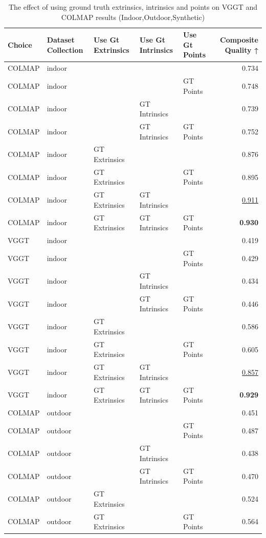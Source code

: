 \begin{table}[H]
\caption{\ifdefined\customcaption \customcaption \else The effect of using ground truth extrinsics, intrinsics and points on VGGT and COLMAP results (Indoor,Outdoor,Synthetic) \fi}
\label{tab:06_gt_cams_indoor,outdoor,synthetic}
\centering
\scriptsize
\begin{tabular}{lllllr}
\toprule
Choice & Dataset Collection & Use Gt Extrinsics & Use Gt Intrinsics & Use Gt Points & Composite Quality ↑ \\
\midrule
COLMAP & indoor &  &  &  & 0.734 \\
COLMAP & indoor &  &  & GT Points & 0.748 \\
COLMAP & indoor &  & GT Intrinsics &  & 0.739 \\
COLMAP & indoor &  & GT Intrinsics & GT Points & 0.752 \\
COLMAP & indoor & GT Extrinsics &  &  & 0.876 \\
COLMAP & indoor & GT Extrinsics &  & GT Points & 0.895 \\
COLMAP & indoor & GT Extrinsics & GT Intrinsics &  & \underline{0.911} \\
COLMAP & indoor & GT Extrinsics & GT Intrinsics & GT Points & \textbf{0.930} \\
\midrule
VGGT & indoor &  &  &  & 0.419 \\
VGGT & indoor &  &  & GT Points & 0.429 \\
VGGT & indoor &  & GT Intrinsics &  & 0.434 \\
VGGT & indoor &  & GT Intrinsics & GT Points & 0.446 \\
VGGT & indoor & GT Extrinsics &  &  & 0.586 \\
VGGT & indoor & GT Extrinsics &  & GT Points & 0.605 \\
VGGT & indoor & GT Extrinsics & GT Intrinsics &  & \underline{0.857} \\
VGGT & indoor & GT Extrinsics & GT Intrinsics & GT Points & \textbf{0.929} \\
\midrule
COLMAP & outdoor &  &  &  & 0.451 \\
COLMAP & outdoor &  &  & GT Points & 0.487 \\
COLMAP & outdoor &  & GT Intrinsics &  & 0.438 \\
COLMAP & outdoor &  & GT Intrinsics & GT Points & 0.470 \\
COLMAP & outdoor & GT Extrinsics &  &  & 0.524 \\
COLMAP & outdoor & GT Extrinsics &  & GT Points & 0.564 \\

\end{tabular}
\end{table}
